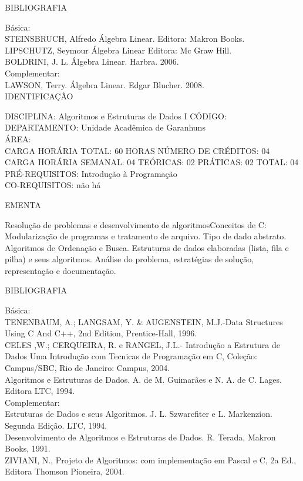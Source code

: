\documentclass[
	12pt,				%
	openright,			%
  oneside,     %
	a4paper,			%
	english,			%
	french,				%
	spanish,			%
	brazil				%
	]{abntex2}
\begin{document}
\begin{apendicesenv}
BIBLIOGRAFIA 

Básica:\\
STEINSBRUCH, Alfredo  Álgebra Linear. Editora: Makron Books.\\
LIPSCHUTZ, Seymour  Álgebra Linear  Editora: Mc Graw Hill.\\
BOLDRINI, J. L. Álgebra Linear. Harbra. 2006.\\
Complementar:\\
LAWSON, Terry. Álgebra Linear. Edgar Blucher. 2008.\\


\newpage IDENTIFICAÇÃO

DISCIPLINA: Algoritmos e Estruturas de Dados I CÓDIGO:\\ 
DEPARTAMENTO: Unidade Acadêmica de Garanhuns\\
ÁREA: \\
CARGA HORÁRIA TOTAL: 60 HORAS NÚMERO DE CRÉDITOS: 04\\
CARGA HORÁRIA SEMANAL: 04 TEÓRICAS: 02 PRÁTICAS: 02 TOTAL: 04\\
PRÉ-REQUISITOS: Introdução à Programação\\
CO-REQUISITOS: não há

EMENTA 

Resolução de problemas e desenvolvimento de algoritmosConceitos de C:
Modularização de programas e tratamento de arquivo. Tipo de dado
abstrato. Algoritmos de Ordenação e Busca. Estruturas de dados
elaboradas (lista, fila e pilha) e seus algoritmos. Análise do
problema, estratégias de solução, representação e documentação.

BIBLIOGRAFIA 

Básica:\\
TENENBAUM, A.; LANGSAM, Y. \& AUGENSTEIN, M.J.-Data Structures Using C
And C++, 2nd Edition, Prentice-Hall, 1996.\\
CELES ,W.; CERQUEIRA, R. e RANGEL, J.L.- Introdução a Estrutura de Dados
Uma Introdução com Tecnicas de Programação em C, Coleção: Campus/SBC,
Rio de Janeiro: Campus, 2004.\\
Algoritmos e Estruturas de Dados. A. de M. Guimarães e N. A. de C.
Lages. Editora LTC, 1994.\\
Complementar:\\
Estruturas de Dados e seus Algoritmos. J. L. Szwarcfiter e L.
Markenzion. Segunda Edição. LTC, 1994.\\
Desenvolvimento de Algoritmos e Estruturas de Dados. R. Terada, Makron
Books, 1991.\\
ZIVIANI, N., Projeto de Algoritmos: com implementação em Pascal e C, 2a
Ed., Editora Thomson Pioneira, 2004.\\



\end{apendicesenv}
\end{document}
